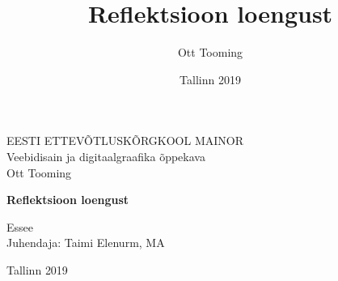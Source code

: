 \documentclass{EUASThesis}
\author{Ott Tooming}
\title{Reflektsioon loengust}
\date{Tallinn 2019}
\newcommand{\AuthorName}{Ott Tooming} %
\newcommand{\UniversityName}{Eesti Ettevõtluskõrgkool Mainor}
\newcommand{\CurriculumName}{Veebidisain ja digitaalgraafika õppekava}
\newcommand{\ThesisTitle}{Reflektsioon loengust} %
\newcommand{\ThesisType}{Essee} %
\newcommand{\InstructorName}{Taimi Elenurm, MA} %
\newcommand{\Location}{Tallinn} %
\newcommand{\Year}{2019} %
\begin{document}

\begin{centering}


{\large
\MakeUppercase{\UniversityName} \\
}
\CurriculumName \\



\vspace{6.5CM}
{\small \AuthorName} \\
\vspace{0.5CM}

{\huge
\bf{
\ThesisTitle \\
}
}

\vspace{0.5CM}
\ThesisType \\
\vspace{1CM}
\hfill{Juhendaja: \InstructorName}



\vspace{8.2cm}
\small{\Location} \small{\Year}
\vspace{1cm}


\end{centering}
\thispagestyle{empty}

\newpage


\end{document}
